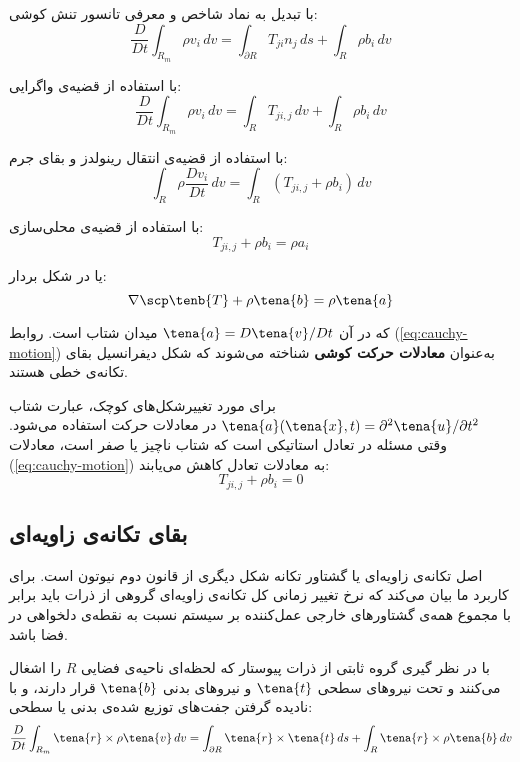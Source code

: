 با تبدیل به نماد شاخص و معرفی تانسور تنش کوشی:
\begin{equation}
	\frac{D}{Dt} \int_{R_m} \rho v_i \, dv = \int_{\partial R} T_{ji} n_j \, ds + \int_R \rho b_i \, dv
\end{equation}

با استفاده از قضیه‌ی واگرایی:
\begin{equation}
	\frac{D}{Dt} \int_{R_m} \rho v_i \, dv = \int_R T_{ji,j} \, dv + \int_R \rho b_i \, dv
\end{equation}

با استفاده از قضیه‌ی انتقال رینولدز و بقای جرم:
\begin{equation}
	\int_R \rho \frac{Dv_i}{Dt} \, dv = \int_R (T_{ji,j} + \rho b_i) \, dv
\end{equation}

با استفاده از قضیه‌ی محلی‌سازی:
\begin{equation}
	T_{ji,j} + \rho b_i = \rho a_i
\end{equation}

یا در شکل بردار:
\begin{equation}
	\nabla \scp \tenb{T} + \rho \tena{b} = \rho \tena{a}
\end{equation}

که در آن $\tena{a} = D\tena{v}/Dt$ میدان شتاب است. روابط (\ref{eq:cauchy-motion}) به‌عنوان \textbf{معادلات حرکت کوشی} شناخته می‌شوند که شکل دیفرانسیل بقای تکانه‌ی خطی هستند.

برای مورد تغییرشکل‌های کوچک، عبارت شتاب $\tena{a}(\tena{x}, t) = \partial^2 \tena{u}/\partial t^2$ در معادلات حرکت استفاده می‌شود. وقتی مسئله در تعادل استاتیکی است که شتاب ناچیز یا صفر است، معادلات (\ref{eq:cauchy-motion}) به معادلات تعادل کاهش می‌یابند:
\begin{equation}
	T_{ji,j} + \rho b_i = 0
\end{equation}

\subsection{بقای تکانه‌ی زاویه‌ای}

اصل تکانه‌ی زاویه‌ای یا گشتاور تکانه شکل دیگری از قانون دوم نیوتون است. برای کاربرد ما بیان می‌کند که نرخ تغییر زمانی کل تکانه‌ی زاویه‌ای گروهی از ذرات باید برابر با مجموع همه‌ی گشتاورهای خارجی عمل‌کننده بر سیستم نسبت به نقطه‌ی دلخواهی در فضا باشد.

با در نظر گیری گروه ثابتی از ذرات پیوستار که لحظه‌ای ناحیه‌ی فضایی $R$ را اشغال می‌کنند و تحت نیروهای سطحی $\tena{t}$ و نیروهای بدنی $\tena{b}$ قرار دارند، و با نادیده گرفتن جفت‌های توزیع شده‌ی بدنی یا سطحی:
\begin{equation}
	\frac{D}{Dt} \int_{R_m} \tena{r} \times \rho \tena{v} \, dv = \int_{\partial R} \tena{r} \times \tena{t} \, ds + \int_R \tena{r} \times \rho \tena{b} \, dv
\end{equation}


